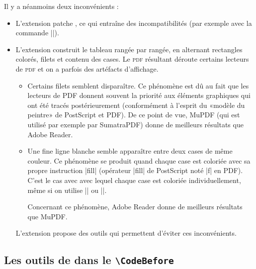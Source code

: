 \documentclass[dvipsnames]{article}
\begin{document}
\medskip
Il y a néanmoins deux inconvénients :
\begin{itemize}[beginpenalty=10000]
\item L'extension  patche , ce qui entraîne des
incompatibilités (par exemple avec la commande |\hdotsfor|).

\item L'extension  construit le tableau rangée par rangée, en
alternant rectangles colorés, filets et contenu des cases. Le \textsc{pdf}
résultant déroute certains lecteurs de \textsc{pdf} et on a parfois des artéfacts
d'affichage.

\begin{itemize}
\item Certains filets semblent disparaître. Ce phénomène est dû au fait que les
lecteurs de PDF donnent souvent la priorité aux éléments graphiques qui ont été
tracés postérieurement (conformément à l'esprit du «modèle du peintre» de
PostScript et PDF). De ce point de vue, MuPDF (qui est utilisé par exemple par
SumatraPDF) donne de meilleurs résultats que Adobe Reader.

\item Une fine ligne blanche semble apparaître entre deux cases de même
couleur. Ce phénomène se produit quand chaque case est coloriée avec sa
propre instruction |fill| (opérateur |fill| de PostScript noté |f| en PDF).
C'est le cas avec  avec lequel chaque case est coloriée
individuellement, même si on utilise |\columncolor| ou |\rowcolor|.

Concernant ce phénomène, Adobe Reader donne de meilleurs résultats que
MuPDF. %
\end{itemize}

L'extension  propose des outils qui permettent d'éviter ces
inconvénients.
\end{itemize}

\subsection{Les outils de \texorpdfstring{}{nicematrix} dans le \texttt{\textbackslash CodeBefore}}

\label{color-in-code-before}
\end{document}
